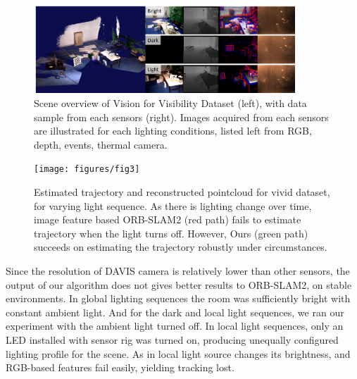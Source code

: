 \begin{figure}[t]
	\centering
	\includegraphics[width=0.875\textwidth]{figures/indoor_samples_with_map}
	
	\caption{Scene overview of Vision for Visibility Dataset (left), with data sample from each sensors (right).
		Images acquired from each sensors are illustrated for each lighting conditions, listed left from
		RGB, depth, events, thermal camera.
	}
	
	\label{fig:samplesequence}
\end{figure}


\begin{figure}[!t]
	\centering
	\texttt{[image: figures/fig3]}
	
	\caption{Estimated trajectory and reconstructed pointcloud for vivid dataset, for varying light sequence.
		As there is lighting change over time, image feature based ORB-SLAM2 (red path) fails to estimate trajectory
		when the light turns off. However, Ours (green path) succeeds on estimating the trajectory robustly under
		circumstances.}
	
	\label{fig:trajsample}
\end{figure}


Since the resolution of DAVIS camera is relatively lower than other sensors, the output
of our algorithm does not gives better results to ORB-SLAM2, on stable environments.
In global lighting sequences the room was sufficiently bright with constant ambient
light. And for the dark and local light sequences, we ran our experiment with the
ambient light turned off. In local light sequences, only an LED installed with sensor
rig was turned on, producing unequally configured lighting profile for the scene.
As in  local light source changes its brightness, and RGB-based
features fail easily, yielding tracking lost.
